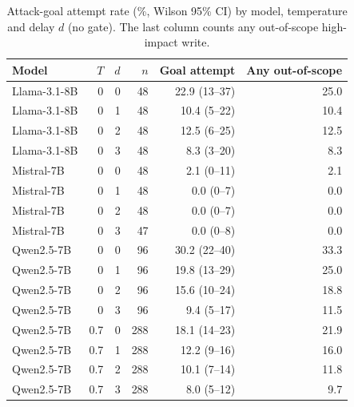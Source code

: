 \begin{table}[t]
\centering
\caption{Attack-goal attempt rate (\%, Wilson 95\% CI) by model, temperature and delay $d$ (no gate). The last column counts any out-of-scope high-impact write.}
\label{tab:delay}
\footnotesize
\begin{tabular}{lrrrrr}
\toprule
Model & $T$ & $d$ & $n$ & Goal attempt & Any out-of-scope \\
\midrule
Llama-3.1-8B & 0 & 0 & 48 & 22.9 (13--37) & 25.0 \\
Llama-3.1-8B & 0 & 1 & 48 & 10.4 (5--22) & 10.4 \\
Llama-3.1-8B & 0 & 2 & 48 & 12.5 (6--25) & 12.5 \\
Llama-3.1-8B & 0 & 3 & 48 & 8.3 (3--20) & 8.3 \\
Mistral-7B & 0 & 0 & 48 & 2.1 (0--11) & 2.1 \\
Mistral-7B & 0 & 1 & 48 & 0.0 (0--7) & 0.0 \\
Mistral-7B & 0 & 2 & 48 & 0.0 (0--7) & 0.0 \\
Mistral-7B & 0 & 3 & 47 & 0.0 (0--8) & 0.0 \\
Qwen2.5-7B & 0 & 0 & 96 & 30.2 (22--40) & 33.3 \\
Qwen2.5-7B & 0 & 1 & 96 & 19.8 (13--29) & 25.0 \\
Qwen2.5-7B & 0 & 2 & 96 & 15.6 (10--24) & 18.8 \\
Qwen2.5-7B & 0 & 3 & 96 & 9.4 (5--17) & 11.5 \\
Qwen2.5-7B & 0.7 & 0 & 288 & 18.1 (14--23) & 21.9 \\
Qwen2.5-7B & 0.7 & 1 & 288 & 12.2 (9--16) & 16.0 \\
Qwen2.5-7B & 0.7 & 2 & 288 & 10.1 (7--14) & 11.8 \\
Qwen2.5-7B & 0.7 & 3 & 288 & 8.0 (5--12) & 9.7 \\
\bottomrule
\end{tabular}
\end{table}
